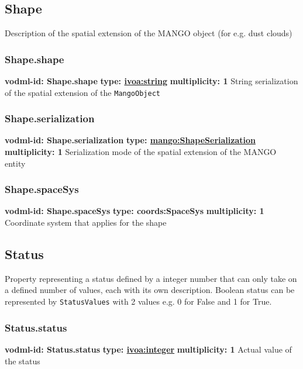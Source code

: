   \subsection{Shape}
  \label{sect:Shape}
    Description of the spatial extension of the MANGO object (for e.g. dust clouds)

    \subsubsection{Shape.shape}
      \textbf{vodml-id: Shape.shape} \newline
      \textbf{type: \hyperref[sect:ivoa]{ivoa:string}} \newline
      \textbf{multiplicity: 1} \newline
      String serialization of the spatial extension of the \texttt{MangoObject}

    \subsubsection{Shape.serialization}
      \textbf{vodml-id: Shape.serialization} \newline
      \textbf{type: \hyperref[sect:ShapeSerialization]{mango:ShapeSerialization}} \newline
      \textbf{multiplicity: 1} \newline
      Serialization mode of the spatial extension of the MANGO entity

    \subsubsection{Shape.spaceSys}
      \textbf{vodml-id: Shape.spaceSys} \newline
      \textbf{type: coords:SpaceSys} \newline
      \textbf{multiplicity: 1} \newline
      Coordinate system that applies for the shape

  \subsection{Status}
  \label{sect:Status}
    Property representing a status defined by a integer number that can only take on a defined number of values, each with its own description. Boolean status can be represented by \texttt{StatusValues} with 2 values e.g. 0 for False and 1 for True.

    \subsubsection{Status.status}
      \textbf{vodml-id: Status.status} \newline
      \textbf{type: \hyperref[sect:ivoa]{ivoa:integer}} \newline
      \textbf{multiplicity: 1} \newline
      Actual value of the status

